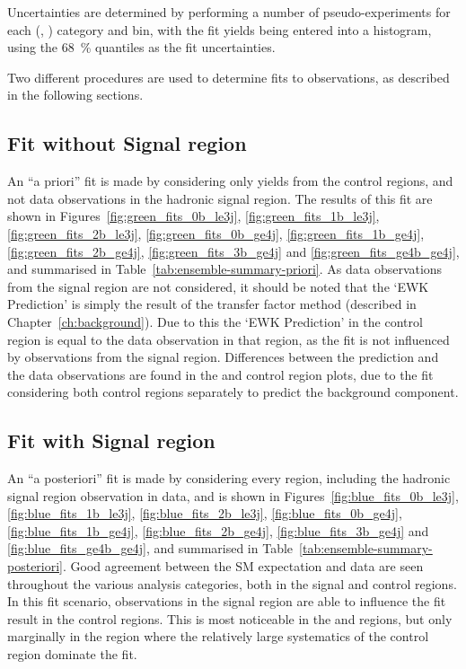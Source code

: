 Uncertainties are determined by performing a number of pseudo-experiments for
each (\nb, \nj) category and \HT bin, with the fit yields being entered into a
histogram, using the 68~\% quantiles as the fit uncertainties.

Two different procedures are used to determine fits to observations, as described
in the following sections.

\subsection{Fit without Signal region}
\label{sec:results_fit_green}
An ``a priori'' fit is made by considering only yields from the control regions,
and not data observations in the hadronic signal region. The results of this fit
are shown in Figures~\ref{fig:green_fits_0b_le3j}, \ref{fig:green_fits_1b_le3j}, \ref{fig:green_fits_2b_le3j}, \ref{fig:green_fits_0b_ge4j}, \ref{fig:green_fits_1b_ge4j}, \ref{fig:green_fits_2b_ge4j}, \ref{fig:green_fits_3b_ge4j} and \ref{fig:green_fits_ge4b_ge4j},
and summarised in Table~\ref{tab:ensemble-summary-priori}. As data
observations from the signal region are not considered, it should be noted that
the `EWK Prediction' is simply the result of the transfer factor method
(described in Chapter~\ref{ch:background}). Due to this the `EWK 
Prediction' in the \mj control region is equal to the data observation in
that region, as the fit is not influenced by observations from the signal region.
Differences between the prediction and the data observations are found in the
\mmj and \gj control region plots, due to the fit considering both control regions
separately to predict the \zinv background component.

\subsection{Fit with Signal region}
An ``a posteriori'' fit is made by considering every region, including the
hadronic signal region observation in data, and is shown in
Figures~\ref{fig:blue_fits_0b_le3j}, \ref{fig:blue_fits_1b_le3j}, \ref{fig:blue_fits_2b_le3j}, \ref{fig:blue_fits_0b_ge4j}, \ref{fig:blue_fits_1b_ge4j}, \ref{fig:blue_fits_2b_ge4j}, \ref{fig:blue_fits_3b_ge4j} and \ref{fig:blue_fits_ge4b_ge4j},
and summarised in Table~\ref{tab:ensemble-summary-posteriori}. Good agreement
between the SM expectation and data are seen throughout the various analysis
categories, both in the signal and control regions. In this fit scenario,
observations in the signal region are able to influence the
fit result in the control regions. This is most noticeable in the \mmj and \gj regions,
but only marginally in the \mj region where the relatively large systematics of
the control region dominate the fit. 


